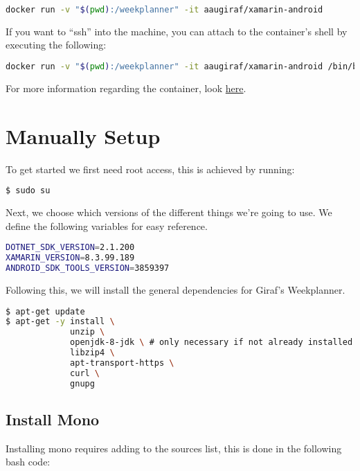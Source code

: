 \begin{lstlisting}[language=bash]
docker run -v "$(pwd):/weekplanner" -it aaugiraf/xamarin-android
\end{lstlisting}

If you want to ``ssh'' into the machine, you can attach to the
container's shell by executing the following:

\begin{lstlisting}[language=bash]
docker run -v "$(pwd):/weekplanner" -it aaugiraf/xamarin-android /bin/bash
\end{lstlisting}

For more information regarding the container, look
\href{https://cloud.docker.com/u/aaugiraf/repository/docker/aaugiraf/xamarin-android/general}{here}.

\section{Manually Setup}

To get started we first need root access, this is achieved by running:

\begin{lstlisting}[language=bash]
$ sudo su
\end{lstlisting}

Next, we choose which versions of the different things we're going to
use. We define the following variables for easy reference.

\begin{lstlisting}[language=bash]
DOTNET_SDK_VERSION=2.1.200
XAMARIN_VERSION=8.3.99.189
ANDROID_SDK_TOOLS_VERSION=3859397
\end{lstlisting}

Following this, we will install the general dependencies for Giraf's
Weekplanner.

\begin{lstlisting}[language=bash]
$ apt-get update
$ apt-get -y install \
             unzip \
             openjdk-8-jdk \ # only necessary if not already installed
             libzip4 \
             apt-transport-https \
             curl \
             gnupg
\end{lstlisting}

\subsection{Install Mono}

Installing mono requires adding to the sources list, this is done in the
following bash code:

